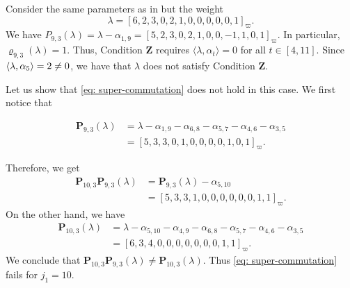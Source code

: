 


\begin{example}\rm
Consider the same parameters as in  but  the weight 
\[
    \lambda = [6, 2, 3, 0, 2, 1, 0, 0, 0, 0, 0, 1]_{\varpi}.
\]
We have $P_{9,3}(\lambda) = \lambda - \alpha_{1,9} = [5, 2, 3, 0, 2, 1, 0, 0, -1, 1, 0, 1]_{\varpi}$.
In particular, $\varrho_{9,3}(\lambda)=1$. 
Thus,  Condition $\mathbf{Z}$ requires $\langle \lambda, \alpha_t \rangle = 0$ for all $t \in  [4, 11]$. 
Since  $\langle \lambda , \alpha_5 \rangle = 2\neq 0$, we have that $\lambda$ does not satisfy Condition $\mathbf{Z}$. 

Let us show that \eqref{eq: super-commutation} does not hold in this case. 
We first notice that

\begin{equation}
\begin{aligned}
    \mathbf{P}_{9,3}(\lambda) &= \lambda - \alpha_{1,9}- \alpha_{6,8}- \alpha_{5,7}- \alpha_{4,6}- \alpha_{3,5} \\
    &= [5, 3, 3, 0, 1, 0, 0, 0, 0, 1, 0, 1]_\varpi.
\end{aligned}
\end{equation}

Therefore, we get
\begin{equation}
\begin{aligned}
    \mathbf{P}_{10,3}\mathbf{P}_{9,3}(\lambda) &= \mathbf{P}_{9,3}(\lambda)- \alpha_{5,10} \\
    &= [5, 3, 3, 1, 0, 0, 0, 0, 0, 0, 1, 1]_\varpi.
\end{aligned}
\end{equation}
On the other hand, we have
\begin{equation}
    \begin{aligned}
         \mathbf{P}_{10,3}(\lambda) &= \lambda- \alpha_{5,10} - \alpha_{4,9}- \alpha_{6,8}- \alpha_{5,7}- \alpha_{4,6}- \alpha_{3,5} \\
    &= [6, 3, 4, 0, 0, 0, 0, 0, 0, 0, 1, 1]_\varpi.
    \end{aligned}
\end{equation}
We conclude that 
$   \mathbf{P}_{10,3}\mathbf{P}_{9,3}(\lambda) \neq \mathbf{P}_{10,3}(\lambda)$. 
Thus \eqref{eq: super-commutation} fails for $j_1=10$. 
\end{example}




